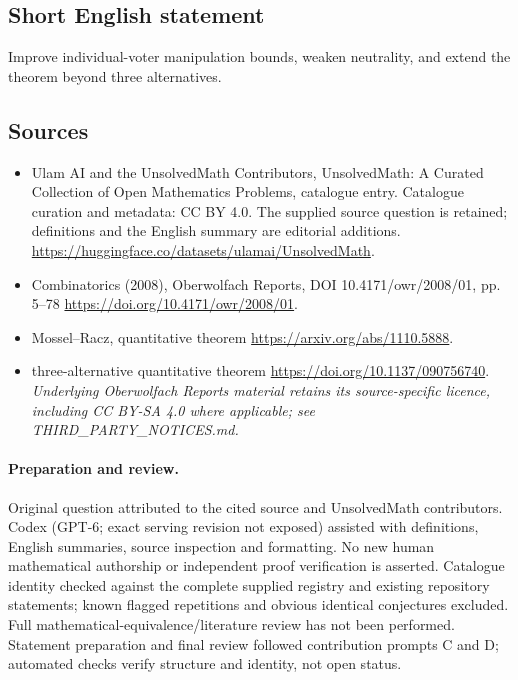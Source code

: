 \documentclass[11pt]{article}
\begin{document}
\subsection{Short English statement}
Improve individual-voter manipulation bounds, weaken neutrality, and extend the theorem beyond three alternatives.
\subsection{Sources}
\begin{itemize}
\item[\hypertarget{source:statement:1}{S1}] Ulam AI and the UnsolvedMath Contributors, UnsolvedMath: A Curated Collection of Open Mathematics Problems, catalogue entry. Catalogue curation and metadata: CC BY 4.0. The supplied source question is retained; definitions and the English summary are editorial additions.
\url{https://huggingface.co/datasets/ulamai/UnsolvedMath}.
\item[\hypertarget{source:statement:2}{S2}] Combinatorics (2008), Oberwolfach Reports, DOI 10.4171/owr/2008/01, pp. 5--78
\url{https://doi.org/10.4171/owr/2008/01}.
\item[\hypertarget{source:statement:3}{S3}] Mossel--Racz, quantitative theorem
\url{https://arxiv.org/abs/1110.5888}.
\item[\hypertarget{source:statement:4}{S4}] three-alternative quantitative theorem
\url{https://doi.org/10.1137/090756740}.
\textit{Underlying Oberwolfach Reports material retains its source-specific licence, including CC BY-SA 4.0 where applicable; see THIRD\_PARTY\_NOTICES.md.}
\end{itemize}
\paragraph{Preparation and review.}
Original question attributed to the cited source and UnsolvedMath contributors. Codex (GPT-6; exact serving revision not exposed) assisted with definitions, English summaries, source inspection and formatting. No new human mathematical authorship or independent proof verification is asserted. Catalogue identity checked against the complete supplied registry and existing repository statements; known flagged repetitions and obvious identical conjectures excluded. Full mathematical-equivalence/literature review has not been performed. Statement preparation and final review followed contribution prompts C and D; automated checks verify structure and identity, not open status.
\label{end:statement}
\end{document}
